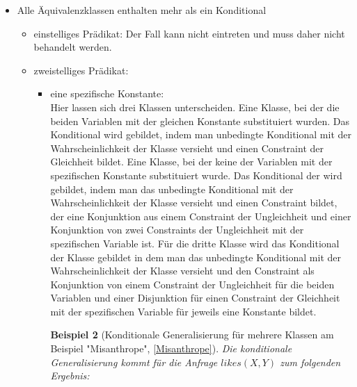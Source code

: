 \documentclass[a4paper, 11pt]{book}
\newtheorem{Bsp}{Beispiel}[section]
\begin{document}
\begin{itemize}
\begin{itemize}
\begin{Bsp}[Konditionale Generalisierung am Beispiel "{}Birds3Classes"{}]
		\noindent
		Klasse 1: $ \{flies(Sylvester)[0.664], flies(Kirby)[0.664]\}  $\\
		Klasse 2: $ \{flies(Tweety)[0]\} $\\
		Klasse 3: $ \{flies(Bully)[0.3]\} $\\
		\\
		Das Konditional für Klasse 1: $ flies(X)[0.664]<(X = Sylvester \lor  X = Kirby)>$\\
		Die Konditional für Klasse 2: $ flies(Tweety)[0] $\\
		Das Konditional für Klasse 3: $ flies(Bully)[0.3] $
		\end{Bsp}
		\item zweistelliges Prädikat:\\ 
		Dieser Fall ist nicht zu betrachten, da die Klassen bei zweistelligen Prädikaten jeweils mindestens zwei Elemente enthalten.
			\end{itemize}
	\item Alle Äquivalenzklassen enthalten mehr als ein Konditional
	\begin{itemize}
		\item einstelliges Prädikat: Der Fall kann nicht eintreten und muss daher nicht behandelt werden.  \\
		\item zweistelliges Prädikat:\\
		\begin{itemize}
			\item eine spezifische Konstante:\\
			Hier lassen sich drei Klassen unterscheiden. Eine Klasse, bei der die beiden Variablen mit der gleichen Konstante substituiert wurden. Das Konditional wird gebildet, indem man unbedingte Konditional mit der Wahrscheinlichkeit der Klasse versieht und einen Constraint der Gleichheit bildet. Eine Klasse, bei der keine der Variablen mit der spezifischen Konstante substituiert wurde. Das Konditional der wird gebildet, indem man das unbedingte Konditional mit der Wahrscheinlichkeit der Klasse versieht und einen Constraint bildet, der eine Konjunktion aus einem Constraint der Ungleichheit und einer Konjunktion von zwei Constraints der Ungleichheit mit der spezifischen Variable ist. Für die dritte Klasse wird das Konditional der Klasse gebildet in dem man das unbedingte Konditional mit der Wahrscheinlichkeit der Klasse versieht und den Constraint als Konjunktion von einem Constraint der Ungleichheit für die beiden Variablen und einer Disjunktion für einen Constraint der Gleichheit mit der spezifischen Variable für jeweils eine Konstante bildet.\\
			\begin{Bsp}[Konditionale Generalisierung für mehrere Klassen am Beispiel "{}Misanthrope"{}, \ref{Misanthrope}] Die konditionale Generalisierung kommt für die Anfrage $ likes(X,Y) $ zum folgenden Ergebnis:\\
				

\end{Bsp}
\end{itemize}
\end{itemize}
\end{itemize}
\end{document}
